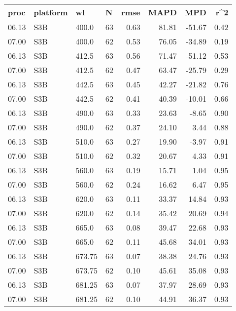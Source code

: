 \documentclass[preview]{standalone}
\begin{document}
\footnotesize



\begin{table}

\begin{tabular}{llllrrrr}
\toprule
                   proc & platform &      wl &   N &  rmse &   MAPD &     MPD &  r\textasciicircum 2 \\
\midrule
06.13 &  S3B &   400.0 &  63 &  0.63 &   81.81 &  -51.67 & 0.42 \\
07.00 &  S3B &   400.0 &  62 &  0.53 &  76.05 &  -34.89 & 0.19 \\\hline
06.13 &  S3B &   412.5 &  63 &  0.56 &   71.47 &  -51.12 & 0.53 \\
07.00 &  S3B &   412.5 &  62 &  0.47 &  63.47 &  -25.79 & 0.29 \\\hline
06.13 &  S3B &   442.5 &  63 &  0.45 &   42.27 &  -21.82 & 0.76 \\
07.00 &  S3B &   442.5 &  62 &  0.41 &  40.39 &  -10.01 & 0.66 \\\hline
06.13 &  S3B &   490.0 &  63 &  0.33 &   23.63 &   -8.65 & 0.90 \\
07.00 &  S3B &   490.0 &  62 &  0.37 &  24.10 &    3.44 & 0.88 \\\hline
06.13 &  S3B &   510.0 &  63 &  0.27 &   19.90 &   -3.97 & 0.91 \\
07.00 &  S3B &   510.0 &  62 &  0.32 &  20.67 &    4.33 & 0.91 \\\hline
06.13 &  S3B &   560.0 &  63 &  0.19 &   15.71 &    1.04 & 0.95 \\
07.00 &  S3B &   560.0 &  62 &  0.24 &  16.62 &    6.47 & 0.95 \\\hline
06.13 &  S3B &   620.0 &  63 &  0.11 &   33.37 &   14.84 & 0.93 \\
07.00 &  S3B &   620.0 &  62 &  0.14 &  35.42 &   20.69 & 0.94 \\\hline
06.13 &  S3B &   665.0 &  63 &  0.08 &   39.47 &   22.68 & 0.93 \\
07.00 &  S3B &   665.0 &  62 &  0.11 &  45.68 &   34.01 & 0.93 \\\hline
06.13 &  S3B &  673.75 &  63 &  0.07 &   38.38 &   24.76 & 0.93 \\
07.00 &  S3B &  673.75 &  62 &  0.10 &  45.61 &   35.08 & 0.93 \\\hline
06.13 &  S3B &  681.25 &  63 &  0.07 &   37.97 &   28.69 & 0.93 \\
07.00 &  S3B &  681.25 &  62 &  0.10 &  44.91 &   36.37 & 0.93 \\\hline

\end{tabular}
\end{table}
\end{document}
